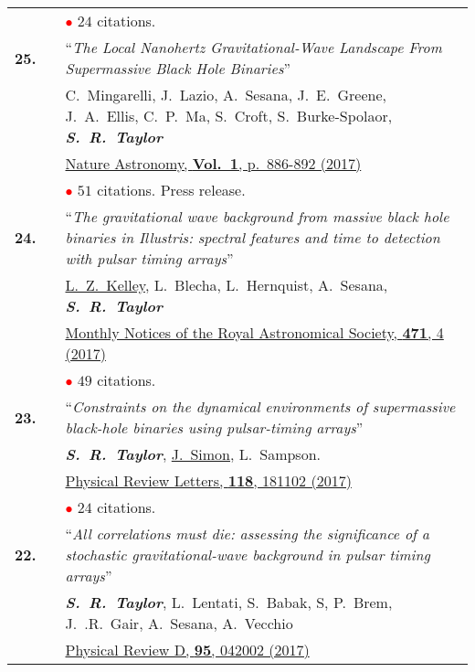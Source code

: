 \documentclass[11pt,letterpaper,sans]{moderncv}
\begin{document}
{\begin{longtable}{rp{0.3cm}p{15.8cm}}
&& \textcolor{red}{$\bullet$} $24$ citations. \vspace{0.09cm}\\
\textbf{25.} & & ``\textit{The Local Nanohertz Gravitational-Wave Landscape From Supermassive Black Hole Binaries}'' \\ 
&&C.~Mingarelli, J.~Lazio, A.~Sesana, J.~E.~Greene, J.~A.~Ellis, C.~P.~Ma, S.~Croft, S.~Burke-Spolaor, \textit{\textbf{S.~R.~Taylor}} \\
&& \href{https://www.nature.com/articles/s41550-017-0299-6}{{\color{color1} Nature Astronomy, \textbf{Vol.~1}, p.~886-892 (2017)}} \\
&& \textcolor{red}{$\bullet$} $51$ citations. Press release. \vspace{0.09cm}\\
\textbf{24.} & & ``\textit{The gravitational wave background from massive black hole binaries in Illustris: spectral features and time to detection with pulsar timing arrays}'' \\ 
&& \underline{L.~Z.~Kelley}, L.~Blecha, L.~Hernquist, A.~Sesana, \textit{\textbf{S.~R.~Taylor}} \\ 
&& \href{https://academic.oup.com/mnras/article/471/4/4508/3899130/The-gravitational-wave-background-from-massive}{{\color{color1} Monthly Notices of the Royal Astronomical Society, \textbf{471}, 4 (2017)}} \\
&& \textcolor{red}{$\bullet$} $49$ citations. \vspace{0.09cm}\\
\textbf{23.} & & ``\textit{Constraints on the dynamical environments of supermassive black-hole binaries using pulsar-timing arrays}'' \\ 
&& \textit{\textbf{S.~R.~Taylor}}, \underline{J.~Simon}, L.~Sampson. \\
&& \href{https://journals.aps.org/prl/abstract/10.1103/PhysRevLett.118.181102}{{\color{color1} Physical Review Letters, \textbf{118}, 181102 (2017)}} \\
&& \textcolor{red}{$\bullet$} $24$ citations. \vspace{0.09cm}\\
\textbf{22.} & & ``\textit{All correlations must die: assessing the significance of a stochastic gravitational-wave background in pulsar timing arrays}'' \\ 
&& \textit{\textbf{S.~R.~Taylor}},  L.~Lentati, S.~Babak, S, P.~Brem, J.~.R.~Gair, A.~Sesana, A.~Vecchio \\ 
&&  \href{https://journals.aps.org/prd/abstract/10.1103/PhysRevD.95.042002}{{\color{color1} Physical Review D, \textbf{95}, 042002 (2017)}} \\

\end{longtable}}
\end{document}
